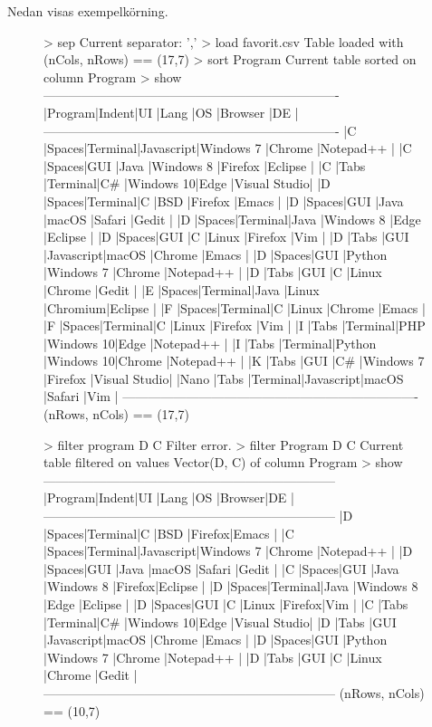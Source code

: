 Nedan visas exempelkörning.
\begin{figure}
\begin{REPLnonum}[basicstyle=\color{white}\ttfamily\fontsize{9}{11}\selectfont]
> sep
Current separator: ','
> load favorit.csv
Table loaded with (nCols, nRows) == (17,7)
> sort Program
Current table sorted on column Program
> show
----------------------------------------------------------------------
|Program|Indent|UI      |Lang      |OS        |Browser |DE           |
----------------------------------------------------------------------
|C      |Spaces|Terminal|Javascript|Windows 7 |Chrome  |Notepad++    |
|C      |Spaces|GUI     |Java      |Windows 8 |Firefox |Eclipse      |
|C      |Tabs  |Terminal|C#        |Windows 10|Edge    |Visual Studio|
|D      |Spaces|Terminal|C         |BSD       |Firefox |Emacs        |
|D      |Spaces|GUI     |Java      |macOS     |Safari  |Gedit        |
|D      |Spaces|Terminal|Java      |Windows 8 |Edge    |Eclipse      |
|D      |Spaces|GUI     |C         |Linux     |Firefox |Vim          |
|D      |Tabs  |GUI     |Javascript|macOS     |Chrome  |Emacs        |
|D      |Spaces|GUI     |Python    |Windows 7 |Chrome  |Notepad++    |
|D      |Tabs  |GUI     |C         |Linux     |Chrome  |Gedit        |
|E      |Spaces|Terminal|Java      |Linux     |Chromium|Eclipse      |
|F      |Spaces|Terminal|C         |Linux     |Chrome  |Emacs        |
|F      |Spaces|Terminal|C         |Linux     |Firefox |Vim          |
|I      |Tabs  |Terminal|PHP       |Windows 10|Edge    |Notepad++    |
|I      |Tabs  |Terminal|Python    |Windows 10|Chrome  |Notepad++    |
|K      |Tabs  |GUI     |C#        |Windows 7 |Firefox |Visual Studio|
|Nano   |Tabs  |Terminal|Javascript|macOS     |Safari  |Vim          |
----------------------------------------------------------------------
 (nRows, nCols) == (17,7)

> filter program D C
Filter error.
> filter Program D C
Current table filtered on values Vector(D, C) of column Program
> show
---------------------------------------------------------------------
|Program|Indent|UI      |Lang      |OS        |Browser|DE           |
---------------------------------------------------------------------
|D      |Spaces|Terminal|C         |BSD       |Firefox|Emacs        |
|C      |Spaces|Terminal|Javascript|Windows 7 |Chrome |Notepad++    |
|D      |Spaces|GUI     |Java      |macOS     |Safari |Gedit        |
|C      |Spaces|GUI     |Java      |Windows 8 |Firefox|Eclipse      |
|D      |Spaces|Terminal|Java      |Windows 8 |Edge   |Eclipse      |
|D      |Spaces|GUI     |C         |Linux     |Firefox|Vim          |
|C      |Tabs  |Terminal|C#        |Windows 10|Edge   |Visual Studio|
|D      |Tabs  |GUI     |Javascript|macOS     |Chrome |Emacs        |
|D      |Spaces|GUI     |Python    |Windows 7 |Chrome |Notepad++    |
|D      |Tabs  |GUI     |C         |Linux     |Chrome |Gedit        |
---------------------------------------------------------------------
(nRows, nCols) == (10,7)


\end{REPLnonum}
\end{figure}
